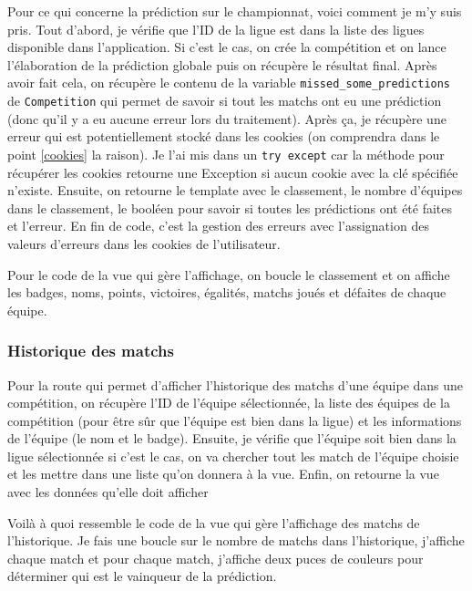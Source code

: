 \documentclass[a4paper,14pt]{extarticle}
\begin{document}
{Pour ce qui concerne la prédiction sur le championnat, voici comment je m'y suis pris. Tout d'abord, je vérifie que l'ID de la ligue est dans la liste des ligues disponible dans l'application. Si c'est le cas, on crée la compétition et on lance l'élaboration de la prédiction globale puis on récupère le résultat final. Après avoir fait cela, on récupère le contenu de la variable \texttt{missed\_some\_predictions} de \texttt{Competition} qui permet de savoir si tout les matchs ont eu une prédiction (donc qu'il y a eu aucune erreur lors du traitement). Après ça, je récupère une erreur qui est potentiellement stocké dans les cookies (on comprendra dans le point \ref{cookies} la raison). Je l'ai mis dans un \texttt{try except} car la méthode pour récupérer les cookies retourne une Exception si aucun cookie avec la clé spécifiée n'existe. Ensuite, on retourne le template avec le classement, le nombre d'équipes dans le classement, le booléen pour savoir si toutes les prédictions ont été faites et l'erreur. En fin de code, c'est la gestion des erreurs avec l'assignation des valeurs d'erreurs dans les cookies de l'utilisateur.


Pour le code de la vue qui gère l'affichage, on boucle le classement et on affiche les badges, noms, points, victoires, égalités, matchs joués et défaites de chaque équipe. 

\subsubsection{Historique des matchs}

Pour la route qui permet d'afficher l'historique des matchs d'une équipe dans une compétition, on récupère l'ID de l'équipe sélectionnée, la liste des équipes de la compétition (pour être sûr que l'équipe est bien dans la ligue) et les informations de l'équipe (le nom et le badge). Ensuite, je vérifie que l'équipe soit bien dans la ligue sélectionnée si c'est le cas, on va chercher tout les match de l'équipe choisie et les mettre dans une liste qu'on donnera à la vue. Enfin, on retourne la vue avec les données qu'elle doit afficher

Voilà à quoi ressemble le code de la vue qui gère l'affichage des matchs de l'historique.
Je fais une boucle sur le nombre de matchs dans l'historique, j'affiche chaque match et pour chaque match, j'affiche deux puces de couleurs pour déterminer qui est le vainqueur de la prédiction. 

}
\end{document}
